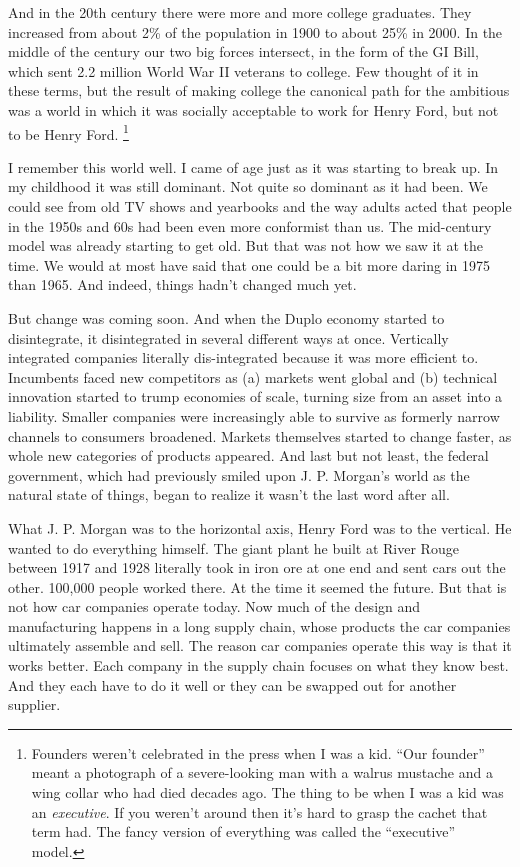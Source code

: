 \documentclass[12pt]{book}
\begin{document}
And in the 20th century there were more and more college graduates. They
increased from about 2\% of the population in 1900 to about 25\% in
2000. In the middle of the century our two big forces intersect, in the
form of the GI Bill, which sent 2.2 million World War II veterans to
college. Few thought of it in these terms, but the result of making
college the canonical path for the ambitious was a world in which it was
socially acceptable to work for Henry Ford, but not to be Henry Ford.
\footnote{Founders weren't celebrated in the press when I was a kid.
``Our founder'' meant a photograph of a severe-looking man with a walrus
mustache and a wing collar who had died decades ago. The thing to be
when I was a kid was an \emph{executive}. If you weren't around then
it's hard to grasp the cachet that term had. The fancy version of
everything was called the ``executive'' model.}

I remember this world well. I came of age just as it was starting to
break up. In my childhood it was still dominant. Not quite so dominant
as it had been. We could see from old TV shows and yearbooks and the way
adults acted that people in the 1950s and 60s had been even more
conformist than us. The mid-century model was already starting to get
old. But that was not how we saw it at the time. We would at most have
said that one could be a bit more daring in 1975 than 1965. And indeed,
things hadn't changed much yet.

But change was coming soon. And when the Duplo economy started to
disintegrate, it disintegrated in several different ways at once.
Vertically integrated companies literally dis-integrated because it was
more efficient to. Incumbents faced new competitors as (a) markets went
global and (b) technical innovation started to trump economies of scale,
turning size from an asset into a liability. Smaller companies were
increasingly able to survive as formerly narrow channels to consumers
broadened. Markets themselves started to change faster, as whole new
categories of products appeared. And last but not least, the federal
government, which had previously smiled upon J. P. Morgan's world as the
natural state of things, began to realize it wasn't the last word after
all.

What J. P. Morgan was to the horizontal axis, Henry Ford was to the
vertical. He wanted to do everything himself. The giant plant he built
at River Rouge between 1917 and 1928 literally took in iron ore at one
end and sent cars out the other. 100,000 people worked there. At the
time it seemed the future. But that is not how car companies operate
today. Now much of the design and manufacturing happens in a long supply
chain, whose products the car companies ultimately assemble and sell.
The reason car companies operate this way is that it works better. Each
company in the supply chain focuses on what they know best. And they
each have to do it well or they can be swapped out for another supplier.
\end{document}
